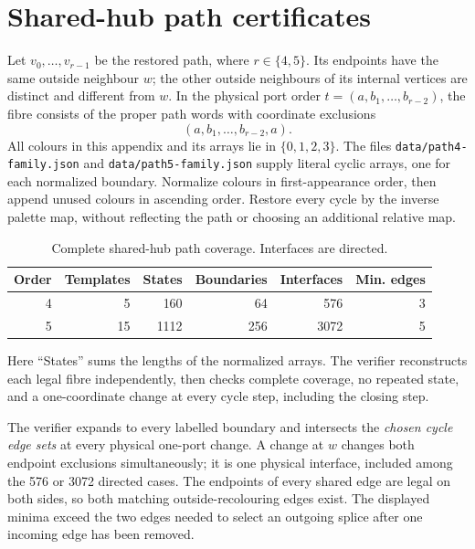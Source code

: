 \documentclass[11pt]{article}
\numberwithin{equation}{section}
\numberwithin{table}{section}
\begin{document}
\clearpage
\section{Shared-hub path certificates}
\label{app:shared-hub-path-certificates}
Let $v_0,\ldots,v_{r-1}$ be the restored path, where $r\in\{4,5\}$.
Its endpoints have the same outside neighbour $w$; the other outside
neighbours of its internal vertices are distinct and different from $w$.
In the physical port order $t=(a,b_1,\ldots,b_{r-2})$, the fibre consists
of the proper path words with coordinate exclusions
\[
 (a,b_1,\ldots,b_{r-2},a).
\]
All colours in this appendix and its arrays lie in $\{0,1,2,3\}$.
The files \texttt{data/path4-family.json} and
\texttt{data/path5-family.json} supply literal cyclic arrays, one for
each normalized boundary. Normalize colours in first-appearance order,
then append unused colours in ascending order. Restore every cycle by
the inverse palette map, without reflecting the path or choosing
an additional relative map.

\begin{table}[htbp]
\centering
\caption{Complete shared-hub path coverage. Interfaces are directed.}
\label{tab:shared-hub-path-counts}
\begin{tabular}{rrrrrr}
\toprule
Order & Templates & States & Boundaries & Interfaces & Min. edges\\
\midrule
4&5&160&64&576&3\\
5&15&1112&256&3072&5\\
\bottomrule
\end{tabular}
\end{table}

Here ``States'' sums the lengths of the normalized arrays. The verifier
reconstructs each legal fibre independently, then checks complete
coverage, no repeated state, and a one-coordinate change at every cycle
step, including the closing step.

The verifier expands to every labelled boundary and intersects the
\emph{chosen cycle edge sets} at every physical one-port change.
A change at $w$ changes both endpoint exclusions simultaneously; it is
one physical interface, included among the 576 or 3072 directed cases.
The endpoints of every shared edge are legal on both sides, so both
matching outside-recolouring edges exist. The displayed minima exceed
the two edges needed to select an outgoing splice after one incoming
edge has been removed.
\end{document}
